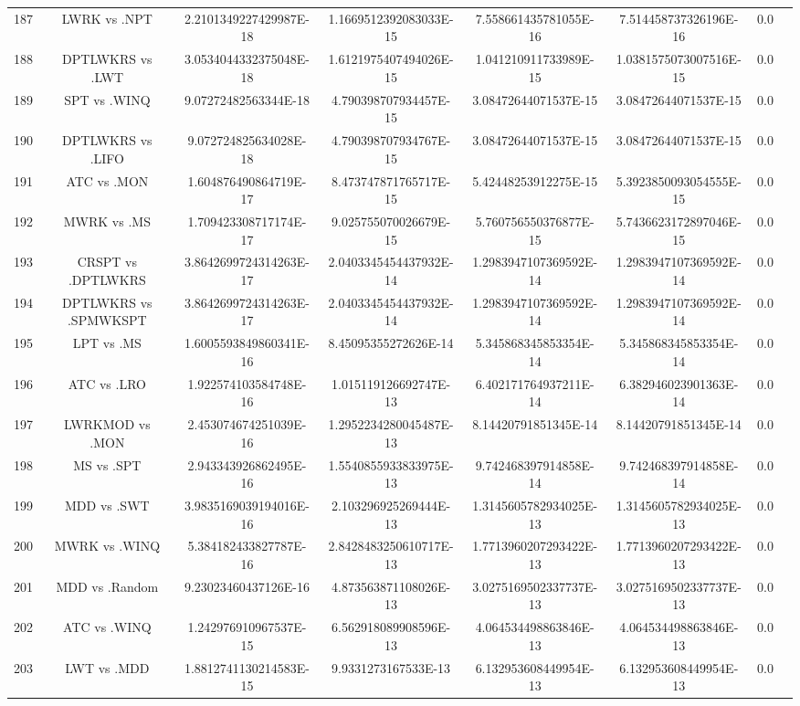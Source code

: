 \documentclass[a3paper,10pt]{article}
\begin{document}
\begin{table}[!htp]
\begin{tabular}{cccccccc}
187&LWRK vs .NPT&2.2101349227429987E-18&1.1669512392083033E-15&7.558661435781055E-16&7.514458737326196E-16&0.0\\
188&DPTLWKRS vs .LWT&3.0534044332375048E-18&1.6121975407494026E-15&1.041210911733989E-15&1.0381575073007516E-15&0.0\\
189&SPT vs .WINQ&9.07272482563344E-18&4.790398707934457E-15&3.08472644071537E-15&3.08472644071537E-15&0.0\\
190&DPTLWKRS vs .LIFO&9.072724825634028E-18&4.790398707934767E-15&3.08472644071537E-15&3.08472644071537E-15&0.0\\
191&ATC vs .MON&1.604876490864719E-17&8.473747871765717E-15&5.42448253912275E-15&5.3923850093054555E-15&0.0\\
192&MWRK vs .MS&1.709423308717174E-17&9.025755070026679E-15&5.760756550376877E-15&5.7436623172897046E-15&0.0\\
193&CRSPT vs .DPTLWKRS&3.8642699724314263E-17&2.0403345454437932E-14&1.2983947107369592E-14&1.2983947107369592E-14&0.0\\
194&DPTLWKRS vs .SPMWKSPT&3.8642699724314263E-17&2.0403345454437932E-14&1.2983947107369592E-14&1.2983947107369592E-14&0.0\\
195&LPT vs .MS&1.6005593849860341E-16&8.45095355272626E-14&5.345868345853354E-14&5.345868345853354E-14&0.0\\
196&ATC vs .LRO&1.922574103584748E-16&1.015119126692747E-13&6.402171764937211E-14&6.382946023901363E-14&0.0\\
197&LWRKMOD vs .MON&2.453074674251039E-16&1.2952234280045487E-13&8.14420791851345E-14&8.14420791851345E-14&0.0\\
198&MS vs .SPT&2.943343926862495E-16&1.5540855933833975E-13&9.742468397914858E-14&9.742468397914858E-14&0.0\\
199&MDD vs .SWT&3.9835169039194016E-16&2.103296925269444E-13&1.3145605782934025E-13&1.3145605782934025E-13&0.0\\
200&MWRK vs .WINQ&5.384182433827787E-16&2.8428483250610717E-13&1.7713960207293422E-13&1.7713960207293422E-13&0.0\\
201&MDD vs .Random&9.23023460437126E-16&4.873563871108026E-13&3.0275169502337737E-13&3.0275169502337737E-13&0.0\\
202&ATC vs .WINQ&1.242976910967537E-15&6.562918089908596E-13&4.064534498863846E-13&4.064534498863846E-13&0.0\\
203&LWT vs .MDD&1.8812741130214583E-15&9.9331273167533E-13&6.132953608449954E-13&6.132953608449954E-13&0.0\\

\end{tabular}
\end{table}
\end{document}
